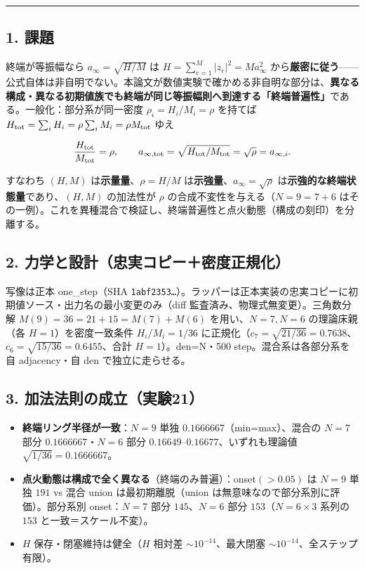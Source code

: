 \documentclass[
  a4paper,
]{ltjsarticle}
\providecommand{\tightlist}{%
  \setlength{\itemsep}{0pt}\setlength{\parskip}{0pt}}
\begin{document}
\begin{center}\rule{0.5\linewidth}{0.5pt}\end{center}

\subsection{1. 課題}\label{ux8ab2ux984c}

終端が等振幅なら \(a_\infty=\sqrt{H/M}\) は
\(H=\sum_{e=1}^M|z_e|^2=Ma_\infty^2\)
から\textbf{厳密に従う}------公式自体は非自明でない。本論文が数値実験で確かめる非自明な部分は、\textbf{異なる構成・異なる初期値族でも終端が同じ等振幅則へ到達する「終端普遍性」}である。一般化：部分系が同一密度
\(\rho_i=H_i/M_i=\rho\) を持てば
\(H_{\rm tot}=\sum_iH_i=\rho\sum_iM_i=\rho M_{\rm tot}\) ゆえ

\[\frac{H_{\rm tot}}{M_{\rm tot}}=\rho,\qquad a_{\infty,\rm tot}=\sqrt{H_{\rm tot}/M_{\rm tot}}=\sqrt\rho=a_{\infty,i}.\]

すなわち \((H,M)\) は\textbf{示量量}、\(\rho=H/M\)
は\textbf{示強量}、\(a_\infty=\sqrt\rho\)
は\textbf{示強的な終端状態量}であり、\((H,M)\) の加法性が \(\rho\)
の合成不変性を与える（\(N=9=7+6\)
はその一例）。これを異種混合で検証し、終端普遍性と点火動態（構成の刻印）を分離する。

\subsection{2.
力学と設計（忠実コピー＋密度正規化）}\label{ux529bux5b66ux3068ux8a2dux8a08ux5fe0ux5b9fux30b3ux30d4ux30fcux5bc6ux5ea6ux6b63ux898fux5316}

写像は正本 one\_step（SHA
\texttt{1abf2353…}）。ラッパーは正本実装の忠実コピーに初期値ソース・出力名の最小変更のみ（diff
監査済み、物理式無変更）。三角数分解 \(M(9)=36=21+15=M(7)+M(6)\)
を用い、\(N=7,N=6\) の理論床親（各 \(H=1\)）を密度一致条件
\(H_i/M_i=1/36\)
に正規化（\(c_7=\sqrt{21/36}=0.7638\)、\(c_6=\sqrt{15/36}=0.6455\)、合計
\(H=1\)）。den=N・500 step。混合系は各部分系を自 adjacency・自 den
で独立に走らせる。

\subsection{3.
加法法則の成立（実験21）}\label{ux52a0ux6cd5ux6cd5ux5247ux306eux6210ux7acbux5b9fux9a1321}

\begin{itemize}
\tightlist
\item
  \textbf{終端リング半径が一致}：\(N=9\) 単独
  \(0.1666667\)（min=max）、混合の \(N=7\) 部分 \(0.1666667\)・\(N=6\)
  部分 \(0.16649\)--\(0.16677\)、いずれも理論値
  \(\sqrt{1/36}=0.1666667\)。
\item
  \textbf{点火動態は構成で全く異なる}（終端のみ普遍）：onset\((>0.05)\)
  は \(N=9\) 単独 \(191\) vs 混合 union は最初期離脱（union
  は無意味なので部分系別に評価）。部分系別 onset：\(N=7\) 部分
  \(145\)、\(N=6\) 部分 \(153\)（\(N=6\times3\) 系列の \(153\)
  と一致＝スケール不変）。
\item
  \(H\) 保存・閉塞維持は健全（\(H\) 相対差 \(\sim10^{-14}\)、最大閉塞
  \(\sim10^{-14}\)、全ステップ有限）。
\end{itemize}
\end{document}
